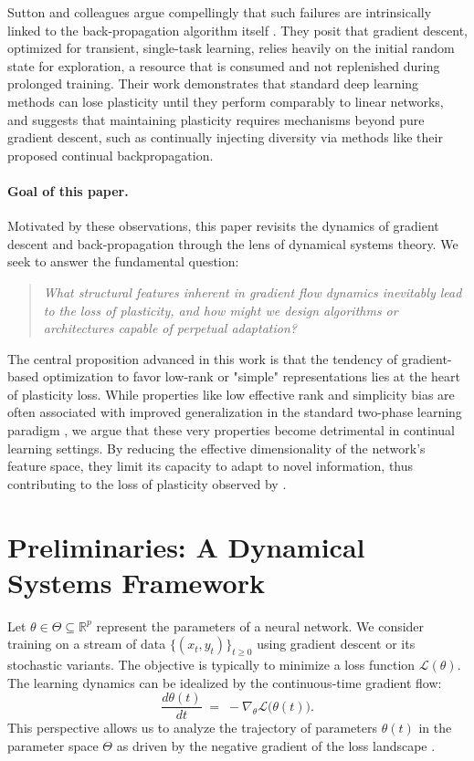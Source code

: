 \documentclass{article}
\newcommand{\Loss}{\mathcal{L}}
\newcommand{\R}{\mathbb{R}}
\begin{document}
Sutton and colleagues argue compellingly that such failures are intrinsically linked to the back-propagation algorithm itself \cite{dohare2024loss}. They posit that gradient descent, optimized for transient, single-task learning, relies heavily on the initial random state for exploration, a resource that is consumed and not replenished during prolonged training. Their work demonstrates that standard deep learning methods can lose plasticity until they perform comparably to linear networks, and suggests that maintaining plasticity requires mechanisms beyond pure gradient descent, such as continually injecting diversity via methods like their proposed continual backpropagation.

\paragraph{Goal of this paper.}
Motivated by these observations, this paper revisits the dynamics of gradient descent and back-propagation through the lens of dynamical systems theory. We seek to answer the fundamental question:
\begin{quote}
\emph{What structural features inherent in gradient flow dynamics inevitably lead to the loss of plasticity, and how might we design algorithms or architectures capable of perpetual adaptation?}
\end{quote}
The central proposition advanced in this work is that the tendency of gradient-based optimization to favor low-rank or "simple" representations lies at the heart of plasticity loss. While properties like low effective rank and simplicity bias are often associated with improved generalization in the standard two-phase learning paradigm \cite{huh2022lowrank, papyan2020prevalence, zhang2017understanding}, we argue that these very properties become detrimental in continual learning settings. By reducing the effective dimensionality of the network's feature space, they limit its capacity to adapt to novel information, thus contributing to the loss of plasticity observed by \cite{dohare2024loss}.

\section{Preliminaries: A Dynamical Systems Framework}
\label{sec:framework}

Let $\theta\in\Theta\subseteq\R^p$ represent the parameters of a neural network. We consider training on a stream of data $\{(x_t,y_t)\}_{t\ge0}$ using gradient descent or its stochastic variants. The objective is typically to minimize a loss function $\Loss(\theta)$. The learning dynamics can be idealized by the continuous-time gradient flow:
\begin{equation}
    \frac{d\theta(t)}{dt} \;=\; -\nabla_\theta\Loss\bigl(\theta(t)\bigr).
    \label{eq:grad_flow}
\end{equation}
This perspective allows us to analyze the trajectory of parameters $\theta(t)$ in the parameter space $\Theta$ as driven by the negative gradient of the loss landscape \cite{saxe2014exact}.
\end{document}

